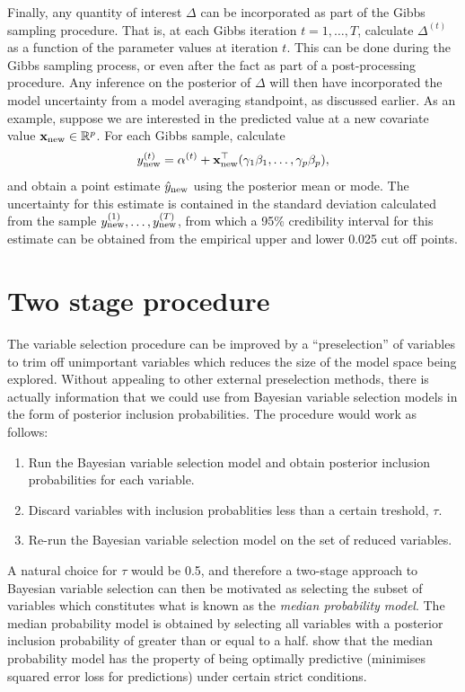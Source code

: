 \documentclass[11pt,twoside,openright]{report}
\begin{document}
Finally, any quantity of interest $\Delta$ can be incorporated as part of the Gibbs sampling procedure.
That is, at each Gibbs iteration $t=1,\dots,T$, calculate $\Delta^{(t)}$ as a function of the parameter values at iteration $t$.
This can be done during the Gibbs sampling process, or even after the fact as part of a post-processing procedure.
Any inference on the posterior of $\Delta$ will then have incorporated the model uncertainty from a model averaging standpoint, as discussed earlier.
As an example, suppose we are interested in the predicted value at a new covariate value ${\mathbf x}_\text{new} \in \mathbb{R}^p$.
For each Gibbs sample, calculate
\[
  y_{\text{new}}^{(t)} = \alpha^{(t)} + {\mathbf x}_\text{new}^\top (\gamma_1\beta_1,\dots,\gamma_p\beta_p),
\]
and obtain a point estimate $\hat y_{\text{new}}$ using the posterior mean or mode.
The uncertainty for this estimate is contained in the standard deviation calculated from the sample $y_{\text{new}}^{(1)},\dots,y_{\text{new}}^{(T)}$, from which a 95\% credibility interval for this estimate can be obtained from the empirical upper and lower 0.025 cut off points.

\section{Two stage procedure}

The variable selection procedure can be improved by a ``preselection'' of variables to trim off unimportant variables which reduces the size of the model space being explored.
Without appealing to other external preselection methods, there is actually information that we could use from Bayesian variable selection models in the form of posterior inclusion probabilities.
The procedure would work as follows:

\begin{enumerate}
  \item Run the Bayesian variable selection model and obtain posterior inclusion probabilities for each variable.
  \item Discard variables with inclusion probablities less than a certain treshold, $\tau$.
  \item Re-run the Bayesian variable selection model on the set of reduced variables.
\end{enumerate}

A natural choice for $\tau$ would be 0.5, and therefore a two-stage approach to Bayesian variable selection can then be motivated as selecting the subset of variables which constitutes what is known as the \emph{median probability model}.
The median probability model is obtained by selecting all variables with a posterior inclusion probability of greater than or equal to a half.
\citet{Barbieri2004} show that the median probability model has the property of being optimally predictive (minimises squared error loss for predictions) under certain strict conditions. 
\end{document}
